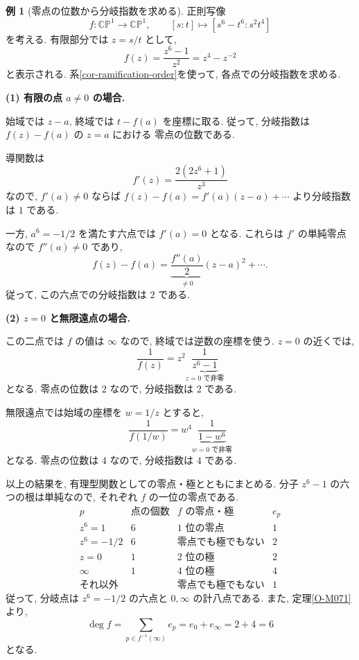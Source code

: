 \documentclass[dvipdfmx,a4paper,11pt]{article} %
\newcommand{\C}{\mathbb{C}}
\theoremstyle{definition}
\numberwithin{equation}{section}
\newtheorem{exa}[thm]{例}
\begin{document}
\begin{exa}[零点の位数から分岐指数を求める]\label{O-M076}
正則写像
\[
f:\C\mathbb P^1\longrightarrow\C\mathbb P^1,\qquad
[s:t]\longmapsto[s^6-t^6:s^2t^4]
\]
を考える.
有限部分では $z=s/t$ として,
\[
f(z)=\frac{z^6-1}{z^2}=z^4-z^{-2}
\]
と表示される.
系\ref{cor-ramification-order}を使って,
各点での分岐指数を求める.

\medskip
\noindent
\textbf{(1) 有限の点 $a\neq0$ の場合.}

始域では $z-a$, 終域では $t-f(a)$ を座標に取る.
従って, 分岐指数は $f(z)-f(a)$ の $z=a$ における
零点の位数である.

導関数は
\[
f'(z)=\frac{2(2z^6+1)}{z^3}
\]
なので, $f'(a)\neq0$ ならば
$f(z)-f(a)=f'(a)(z-a)+\cdots$ より分岐指数は $1$ である.

一方, $a^6=-1/2$ を満たす六点では $f'(a)=0$ となる.
これらは $f'$ の単純零点なので $f''(a)\neq0$ であり,
\[
f(z)-f(a)
=\underbrace{\frac{f''(a)}2}_{\neq0}(z-a)^2+\cdots.
\]
従って, この六点での分岐指数は $2$ である.

\medskip
\noindent
\textbf{(2) $z=0$ と無限遠点の場合.}

この二点では $f$ の値は $\infty$ なので,
終域では逆数の座標を使う.
$z=0$ の近くでは,
\[
\frac1{f(z)}
=z^2\underbrace{\frac1{z^6-1}}_{z=0\text{ で非零}}
\]
となる.
零点の位数は $2$ なので, 分岐指数は $2$ である.

無限遠点では始域の座標を $w=1/z$ とすると,
\[
\frac1{f(1/w)}
=w^4\underbrace{\frac1{1-w^6}}_{w=0\text{ で非零}}
\]
となる.
零点の位数は $4$ なので, 分岐指数は $4$ である.

\medskip
以上の結果を, 有理型関数としての零点・極とともにまとめる.
分子 $z^6-1$ の六つの根は単純なので,
それぞれ $f$ の一位の零点である.
\[
\begin{array}{c|c|c|c}
p&\text{点の個数}&f\text{ の零点・極}&e_p\\ \hline
z^6=1&6&1\text{ 位の零点}&1\\
z^6=-1/2&6&\text{零点でも極でもない}&2\\
z=0&1&2\text{ 位の極}&2\\
\infty&1&4\text{ 位の極}&4\\
\text{それ以外}& &\text{零点でも極でもない}&1
\end{array}
\]
従って, 分岐点は $z^6=-1/2$ の六点と $0,\infty$ の計八点である.
また, 定理\ref{O-M071}より,
\[
\deg f
=\sum_{p\in f^{-1}(\infty)}e_p
=e_0+e_\infty
=2+4=6
\]
となる.
\end{exa}
\end{document}
